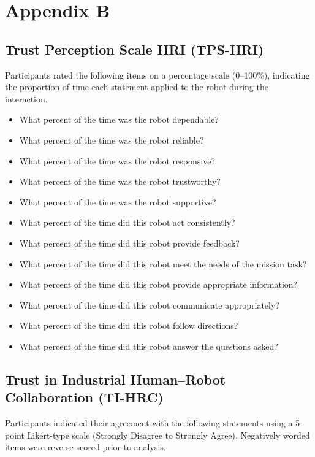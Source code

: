 \documentclass[
  letterpaper,
  DIV=11,
  numbers=noendperiod]{scrartcl}
\providecommand{\tightlist}{%
  \setlength{\itemsep}{0pt}\setlength{\parskip}{0pt}}
\begin{document}
\section{Appendix B}\label{sec-appendix-b}

\subsection{Trust Perception Scale HRI
(TPS-HRI)}\label{trust-perception-scale-hri-tps-hri}

Participants rated the following items on a percentage scale (0--100\%),
indicating the proportion of time each statement applied to the robot
during the interaction.

\begin{itemize}
\tightlist
\item
  What percent of the time was the robot dependable?
\item
  What percent of the time was the robot reliable?
\item
  What percent of the time was the robot responsive?
\item
  What percent of the time was the robot trustworthy?
\item
  What percent of the time was the robot supportive?
\item
  What percent of the time did this robot act consistently?
\item
  What percent of the time did this robot provide feedback?
\item
  What percent of the time did this robot meet the needs of the mission
  task?
\item
  What percent of the time did this robot provide appropriate
  information?
\item
  What percent of the time did this robot communicate appropriately?
\item
  What percent of the time did this robot follow directions?
\item
  What percent of the time did this robot answer the questions asked?
\end{itemize}

\subsection{Trust in Industrial Human--Robot Collaboration
(TI-HRC)}\label{trust-in-industrial-humanrobot-collaboration-ti-hrc}

Participants indicated their agreement with the following statements
using a 5-point Likert-type scale (Strongly Disagree to Strongly Agree).
Negatively worded items were reverse-scored prior to analysis.
\end{document}
